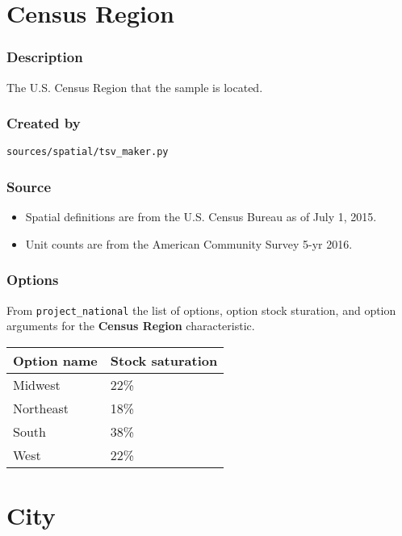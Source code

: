 \section{Census Region}\label{census_region}

\subsubsection{Description}\label{description-13}

The U.S. Census Region that the sample is located.

\subsubsection{Created by}\label{created-by-13}

\texttt{sources/spatial/tsv\_maker.py}

\subsubsection{Source}\label{source-13}

\begin{itemize}
 
\item
  Spatial definitions are from the U.S. Census Bureau as of July 1,
  2015.
\item
  Unit counts are from the American Community Survey 5-yr 2016.
\end{itemize}

\subsubsection{Options}\label{options-13}

From \texttt{project\_national} the list of options, option stock
sturation, and option arguments for the \textbf{Census Region}
characteristic.

\begin{longtable}[]{@{}ll@{}}
\toprule\noalign{}
Option name & Stock saturation \\
\midrule\noalign{}
\endhead
\bottomrule\noalign{}
\endlastfoot
Midwest & 22\% \\
Northeast & 18\% \\
South & 38\% \\
West & 22\% \\
\end{longtable}

\section{City}\label{city}

